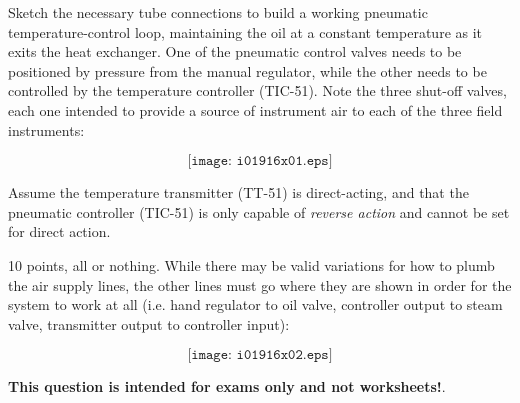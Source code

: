 

Sketch the necessary tube connections to build a working pneumatic temperature-control loop, maintaining the oil at a constant temperature as it exits the heat exchanger.  One of the pneumatic control valves needs to be positioned by pressure from the manual regulator, while the other needs to be controlled by the temperature controller (TIC-51).  Note the three shut-off valves, each one intended to provide a source of instrument air to each of the three field instruments:

$$\texttt{[image: i01916x01.eps]}$$

Assume the temperature transmitter (TT-51) is direct-acting, and that the pneumatic controller (TIC-51) is only capable of {\it reverse action} and cannot be set for direct action.







10 points, all or nothing.  While there may be valid variations for how to plumb the air supply lines, the other lines must go where they are shown in order for the system to work at all (i.e. hand regulator to oil valve, controller output to steam valve, transmitter output to controller input):

$$\texttt{[image: i01916x02.eps]}$$







{\bf This question is intended for exams only and not worksheets!}.



